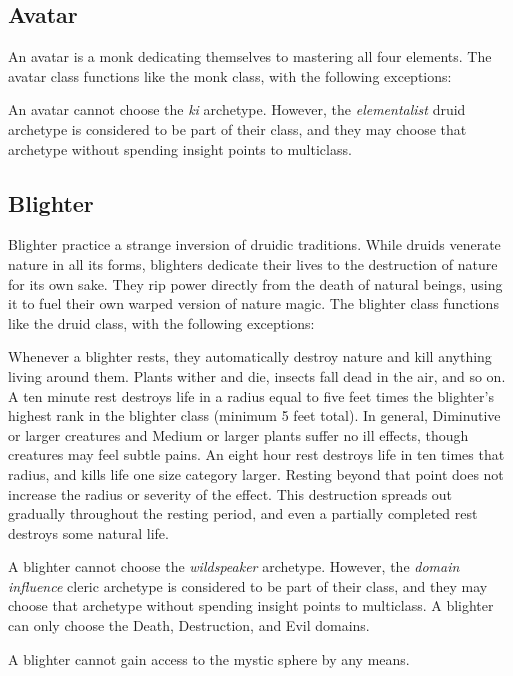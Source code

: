   \subsection{Avatar}
    An avatar is a monk dedicating themselves to mastering all four elements.
    The avatar class functions like the monk class, with the following exceptions:
    \begin{raggeditemize}
      \item An avatar cannot choose the \textit{ki} archetype. However, the \textit{elementalist} druid archetype is considered to be part of their class, and they may choose that archetype without spending insight points to multiclass.
    \end{raggeditemize}

  \subsection{Blighter}
    Blighter practice a strange inversion of druidic traditions.
    While druids venerate nature in all its forms, blighters dedicate their lives to the destruction of nature for its own sake.
    They rip power directly from the death of natural beings, using it to fuel their own warped version of nature magic.
    The blighter class functions like the druid class, with the following exceptions:
    \begin{raggeditemize}
      \item Whenever a blighter rests, they automatically destroy nature and kill anything living around them.
        Plants wither and die, insects fall dead in the air, and so on.
        A ten minute rest destroys life in a radius equal to five feet times the blighter's highest rank in the blighter class (minimum 5 feet total).
        In general, Diminutive or larger creatures and Medium or larger plants suffer no ill effects, though creatures may feel subtle pains.
        An eight hour rest destroys life in ten times that radius, and kills life one size category larger.
        Resting beyond that point does not increase the radius or severity of the effect.
        This destruction spreads out gradually throughout the resting period, and even a partially completed rest destroys some natural life.
      \item A blighter cannot choose the \textit{wildspeaker} archetype.
        However, the \textit{domain influence} cleric archetype is considered to be part of their class, and they may choose that archetype without spending insight points to multiclass.
        A blighter can only choose the Death, Destruction, and Evil domains.
      \item A blighter cannot gain access to the  mystic sphere by any means.
    \end{raggeditemize}

